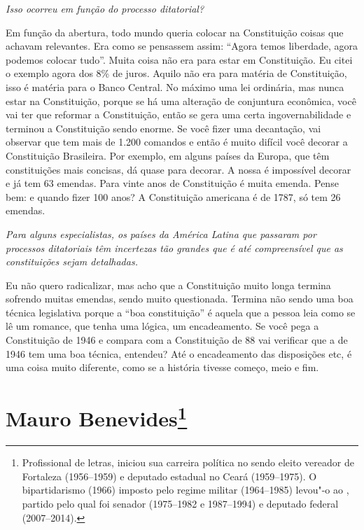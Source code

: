 \medskip

\noindent\emph{Isso ocorreu em função do processo ditatorial?}

Em função da abertura, todo mundo queria colocar na
Constituição coisas que achavam relevantes. Era como se pensassem assim:
``Agora temos liberdade, agora podemos colocar tudo''. Muita coisa não
era para estar em Constituição. Eu citei o exemplo agora dos 8\% de
juros. Aquilo não era para matéria de Constituição, isso é matéria para
o Banco Central. No máximo uma lei ordinária, mas nunca estar na
Constituição, porque se há uma alteração de conjuntura econômica, você
vai ter que reformar a Constituição, então se gera uma certa
ingovernabilidade e terminou a Constituição sendo enorme. Se você fizer
uma decantação, vai observar que tem mais de 1.200 comandos e então é
muito difícil você decorar a Constituição Brasileira. Por exemplo, em
alguns países da Europa, que têm constituições mais concisas, dá quase
para decorar. A nossa é impossível decorar e já tem 63 emendas. Para
vinte anos de Constituição é muita emenda. Pense bem: e quando fizer 100
anos? A Constituição americana é de 1787, só tem 26 emendas.

\medskip

\noindent\emph{Para alguns especialistas, os países da América Latina que
passaram por processos ditatoriais têm incertezas tão grandes que é até
compreensível que as constituições sejam detalhadas.}

Eu não quero radicalizar, mas acho que a Constituição
muito longa termina sofrendo muitas emendas, sendo muito questionada.
Termina não sendo uma boa técnica legislativa porque a ``boa
constituição'' é aquela que a pessoa leia como se lê um romance, que
tenha uma lógica, um encadeamento. Se você pega a Constituição de 1946 e
compara com a Constituição de 88 vai verificar que a de 1946 tem uma boa
técnica, entendeu? Até o encadeamento das disposições etc, é uma coisa
muito diferente, como se a história tivesse começo, meio e fim.

\chapter{Mauro Benevides\footnote{Profissional de letras, iniciou sua carreira política no  sendo
eleito vereador de Fortaleza (1956--1959) e deputado estadual no Ceará
(1959--1975). O bipartidarismo (1966) imposto pelo regime militar
(1964--1985) levou"-o ao , partido pelo qual foi senador (1975--1982 e
1987--1994) e deputado federal (2007--2014).}}

